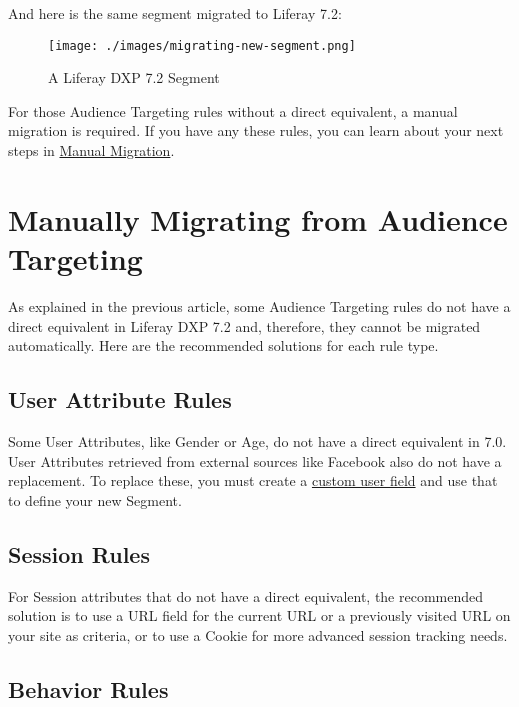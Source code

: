 And here is the same segment migrated to Liferay 7.2:

\begin{figure}
\centering
\texttt{[image: ./images/migrating-new-segment.png]}
\caption{A Liferay DXP 7.2 Segment}
\end{figure}

For those Audience Targeting rules without a direct equivalent, a manual
migration is required. If you have any these rules, you can learn about
your next steps in
\href{/docs/7-2/deploy/-/knowledge_base/d/manually-migrating-from-audience-targeting}{Manual
Migration}.

\chapter{Manually Migrating from Audience
Targeting}\label{manually-migrating-from-audience-targeting}

As explained in the previous article, some Audience Targeting rules do
not have a direct equivalent in Liferay DXP 7.2 and, therefore, they
cannot be migrated automatically. Here are the recommended solutions for
each rule type.

\section{User Attribute Rules}\label{user-attribute-rules}

Some User Attributes, like Gender or Age, do not have a direct
equivalent in 7.0. User Attributes retrieved from external sources like
Facebook also do not have a replacement. To replace these, you must
create a
\href{/docs/7-2/user/-/knowledge_base/u/creating-segments-with-custom-fields-and-session-data}{custom
user field} and use that to define your new Segment.

\section{Session Rules}\label{session-rules}

For Session attributes that do not have a direct equivalent, the
recommended solution is to use a URL field for the current URL or a
previously visited URL on your site as criteria, or to use a Cookie for
more advanced session tracking needs.

\section{Behavior Rules}\label{behavior-rules}

